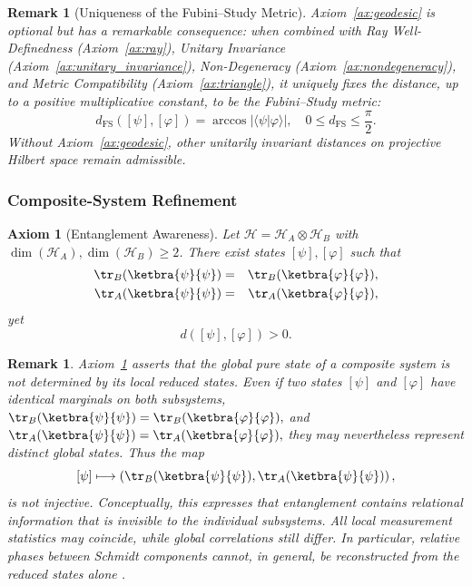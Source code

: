 \documentclass[aps,pra,reprint,nofootinbib,showpacs,superscriptaddress]{revtex4-1}
\newtheorem{axiom}{Axiom}[section]
\newtheorem{remark}[theorem]{Remark}
\newcommand{\Hilbert}{\mathcal{H}}
\begin{document}
\begin{remark}[Uniqueness of the Fubini--Study Metric]
\label{rem:fs_unique}
Axiom~\ref{ax:geodesic} is optional but has a remarkable consequence: when combined with 
Ray Well-Definedness (Axiom~\ref{ax:ray}), Unitary Invariance (Axiom~\ref{ax:unitary_invariance}), 
Non-Degeneracy (Axiom~\ref{ax:nondegeneracy}), and Metric Compatibility (Axiom~\ref{ax:triangle}), 
it uniquely fixes the distance, up to a positive multiplicative constant, to be the \emph{Fubini--Study metric}:
\[
d_{\mathrm{FS}}([\psi],[\varphi]) = \arccos|\langle \psi|\varphi\rangle|, \quad 0 \le d_{\mathrm{FS}} \le \frac{\pi}{2}.
\]
Without Axiom~\ref{ax:geodesic}, other unitarily invariant distances on projective Hilbert space remain admissible.
\end{remark}










\subsubsection{Composite-System Refinement}

\begin{axiom}[Entanglement Awareness]
\label{ax:entanglement_awareness}
Let $\Hilbert = \Hilbert_A \otimes \Hilbert_B$ with $\dim(\Hilbert_A), \dim(\Hilbert_B) \ge 2$. 
There exist states $[\psi],[\varphi]$ such that
\begin{eqnarray}\notag
  \tr_B(\ketbra{\psi}{\psi}) &=& \tr_B(\ketbra{\varphi}{\varphi}), \\ \notag
  \tr_A(\ketbra{\psi}{\psi}) &=& \tr_A(\ketbra{\varphi}{\varphi}),
\end{eqnarray}
yet 
\[
d([\psi],[\varphi]) > 0.
\]
\end{axiom}
\begin{remark}
Axiom~\ref{ax:entanglement_awareness} asserts that the global pure state of a composite system is not determined by its local reduced states. 
Even if two states $[\psi]$ and $[\varphi]$ have identical marginals on both subsystems,
\(
\tr_B(\ketbra{\psi}{\psi}) = \tr_B(\ketbra{\varphi}{\varphi}),\) and \(\tr_A(\ketbra{\psi}{\psi}) = \tr_A(\ketbra{\varphi}{\varphi}),
\)
they may nevertheless represent distinct global states. 
Thus the map
\[
[\psi] \longmapsto 
\left(
\tr_B(\ketbra{\psi}{\psi}),
\tr_A(\ketbra{\psi}{\psi})
\right),
\]
is not injective. Conceptually, this expresses that entanglement contains relational information that is invisible to the individual subsystems. 
All local measurement statistics may coincide, while global correlations still differ. 
In particular, relative phases between Schmidt components cannot, in general, be reconstructed from the reduced states alone \cite{Holevo2011}.
\end{remark}
\end{document}
